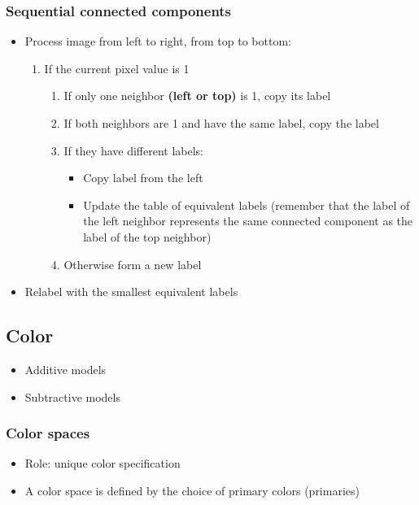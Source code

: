 \documentclass{article}
\begin{document}
        \subsubsection{Sequential connected components}
        \begin{itemize}
            \item Process image from left to right, from top to bottom:
            \begin{enumerate}
                \item If the current pixel value is 1
                \begin{enumerate}
                    \item If only one neighbor \textbf{(left or top)} is 1, copy its label
                    \item If both neighbors are 1 and have the same label, copy the label
                    \item If they have different labels:
                    \begin{itemize}
                        \item Copy label from the left
                        \item Update the table of equivalent labels (remember that the label of the left neighbor represents the same connected component as the label of the top neighbor)
                    \end{itemize}
                    \item Otherwise form a new label
                \end{enumerate}
            \end{enumerate}
            \item Relabel with the smallest equivalent labels
        \end{itemize}

    \subsection{Color}

    \begin{itemize}
        \item Additive models
        \item Subtractive models
    \end{itemize}

        \subsubsection{Color spaces}
        \begin{itemize}
            \item Role: unique color specification
            \item A color space is defined by the choice of primary colors (primaries)
        \end{itemize}
\end{document}
